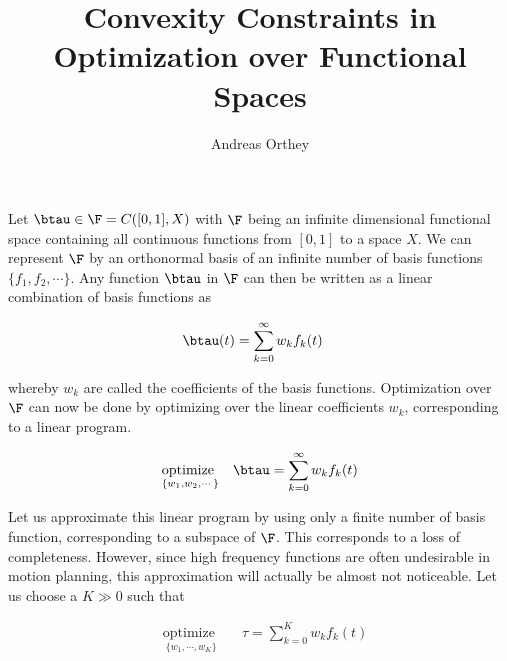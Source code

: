 \documentclass{article}
\begin{document}
 

\title{Convexity Constraints in Optimization over Functional Spaces}
\author{Andreas Orthey}
\date{}
\maketitle

Let $\btau \in \F = C([0,1],X)$ with $\F$ being an infinite dimensional
functional space containing all continuous functions from $[0,1]$ to a space
$X$. We can represent $\F$ by an orthonormal basis of an infinite number of
basis functions $\{f_1,f_2,\cdots\}$. Any function $\btau$ in $\F$ can then be
written as a linear combination of basis functions as

\begin{equation}
        \begin{aligned}
                \btau(t) &= \sum\limits_{k=0}^\infty w_k f_k(t)
        \end{aligned}
\end{equation}

whereby $w_k$ are called the coefficients of the basis functions. Optimization
over $\F$ can now be done by optimizing over the linear coefficients $w_k$,
corresponding to a linear program.

\begin{equation}
        \begin{aligned}
                &\underset{\{w_1,w_2,\cdots\}}{\text{optimize }}&&
                \btau = \sum\limits_{k=0}^\infty w_k f_k(t)\\
        \end{aligned}
\end{equation}

Let us approximate this linear program by using only a finite number of basis
function, corresponding to a subspace of $\F$. This corresponds to a loss of
completeness. However, since high frequency functions
are often undesirable in motion planning, this approximation will actually be
almost not noticeable. Let us choose a $K\gg0$ such that

\begin{equation}
        \begin{aligned}
                &\underset{\{w_1,\cdots,w_K\}}{\text{optimize }}&&
                \tau = \sum\limits_{k=0}^K w_k f_k(t)\\
        \end{aligned}
\end{equation}
\end{document}
